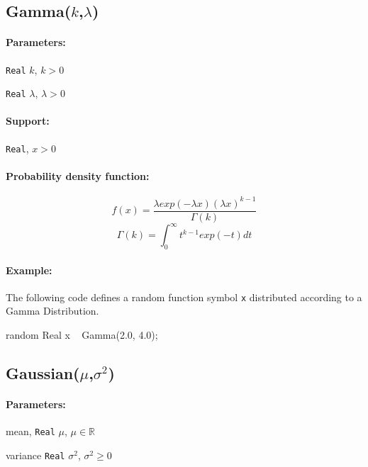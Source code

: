 \subsection{Gamma($k$,$\lambda$)}

\paragraph*{Parameters:}
\begin{itemize*}
\item[] \verb|Real| $k$, $k > 0$
\item[] \verb|Real| $\lambda$, $\lambda > 0$ 
\end{itemize*}

\paragraph*{Support:}
\verb|Real|, $x > 0$

\paragraph*{Probability density function:}
\[
	f(x) = \frac{\lambda exp(-\lambda x) (\lambda x)^{k-1}}{\Gamma(k)}
\]
\[
	\Gamma(k) = \int_{0}^{\infty} t^{k-1}exp(-t) dt
\]

\paragraph*{Example:}
The following code defines a random function symbol \verb|x| distributed according to a Gamma Distribution.
\begin{blogcode}
random Real x ~ Gamma(2.0, 4.0);
\end{blogcode}

\subsection{Gaussian($\mu$,$\sigma^2$)}

\paragraph*{Parameters:} 
\begin{itemize*}
\item[] mean, \verb|Real|
 $\mu$, $\mu \in \mathbb{R}$
\item[] variance \verb|Real|
 $\sigma^2$, $\sigma^2 \geq 0$ 
\end{itemize*}

